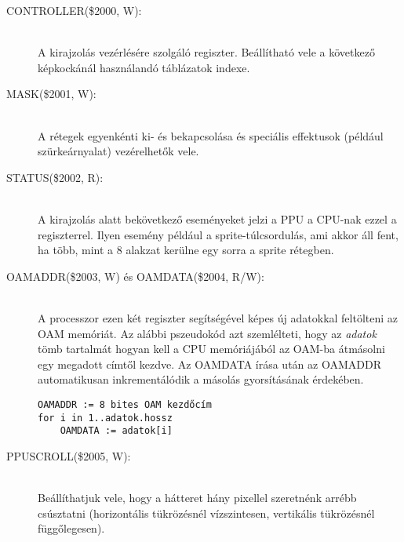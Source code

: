 \begin{description}
	\item[CONTROLLER(\$2000, W):] \hfill \\
	A kirajzolás vezérlésére szolgáló regiszter.
	Beállítható vele a következő képkockánál használandó táblázatok indexe.
	\item[MASK(\$2001, W):] \hfill \\
	A rétegek egyenkénti ki- és bekapcsolása és speciális effektusok 
	(például szürkeárnyalat) vezérelhetők vele.
	\item[STATUS(\$2002, R):] \hfill \\
	A kirajzolás alatt bekövetkező eseményeket jelzi a PPU a CPU-nak ezzel a regiszterrel.
	Ilyen esemény például a sprite-túlcsordulás, ami akkor áll fent, ha több, mint a 8 alakzat kerülne egy sorra a sprite rétegben. 
	\item[OAMADDR(\$2003, W) és OAMDATA(\$2004, R/W):] \hfill \\
	A processzor ezen két regiszter segítségével képes új adatokkal feltölteni az OAM memóriát.
	Az alábbi pszeudokód azt szemlélteti, hogy az \emph{adatok} tömb tartalmát hogyan kell a CPU memóriájából
	az OAM-ba átmásolni egy megadott címtől kezdve. Az OAMDATA írása után az OAMADDR automatikusan inkrementálódik a másolás gyorsításának érdekében.
\begin{lstlisting}
OAMADDR := 8 bites OAM kezdőcím
for i in 1..adatok.hossz
	OAMDATA := adatok[i]
\end{lstlisting}
	\item[PPUSCROLL(\$2005, W):] \hfill \\
	Beállíthatjuk vele, hogy a hátteret hány pixellel szeretnénk arrébb csúsztatni (horizontális tükrözésnél vízszintesen, vertikális tükrözésnél függőlegesen).

\end{description}
